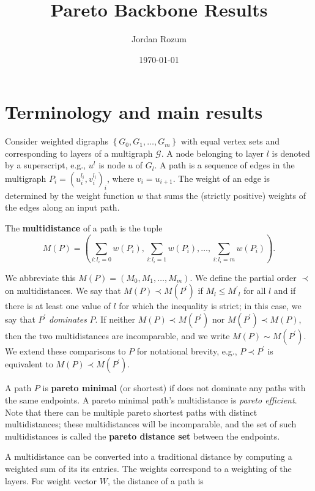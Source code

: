 \documentclass{article}
\title{Pareto Backbone Results}
\author{Jordan Rozum}
\date{\today} %
\begin{document}
\maketitle %

\section{Terminology and main results}

Consider weighted digraphs $\left\{G_0,G_1,\ldots,G_m\right\}$ with equal vertex sets and corresponding
to layers of a multigraph $\mathcal{G}$. A node belonging to layer $l$ is denoted by a superscript, e.g.,
$u^l$ is
node $u$ of $G_l$. A path is a sequence of edges in the multigraph $P_i={(u_i^{l_i},v_i^{l_i})}_i$,
where $v_i=u_{i+1}$. The weight of an edge is determined by the weight function $w$ that sums the
(strictly positive) weights of the edges along an input path.

The {\bf multidistance} of a path is the tuple
\[M(P)=\left(\sum_{i:l_i=0} w(P_i),\sum_{i:l_i=1} w(P_i),\ldots,\sum_{i:l_i=m} w(P_i)\right).\]

We abbreviate this $M(P)=(M_0,M_1,\ldots,M_m)$. We define the partial order $\prec$
on multidistances. We say that $M(P)\prec M(P^\prime)$ if $M_l\leq {M^\prime}_l$ for all $l$ and if
there is at least one value of $l$ for which the inequality is strict; in this case, we say that
$P^\prime$ \emph{dominates} $P$. If neither
$M(P)\prec M(P^\prime)$ nor $M(P^\prime)\prec M(P)$, then the two multidistances are incomparable, and
we write $M(P)\sim M(P^\prime)$. We extend these comparisons to $P$ for notational brevity, e.g.,
$P\prec P^\prime$ is equivalent to $M(P)\prec M(P^\prime)$.

A path $P$ is {\bf pareto minimal} (or shortest) if does not dominate any paths with the same
endpoints. A pareto minimal path's multidistance is \emph{pareto efficient}. Note that there can be
multiple pareto shortest paths with distinct multidistances; these
multidistances will be incomparable, and the set of such multidistances is called the {\bf pareto distance
        set} between the endpoints.

A multidistance can be converted into a traditional distance by computing a weighted sum of its
its entries. The weights correspond to a weighting of the layers. For weight vector $W$,
the distance of a path is
\end{document}
